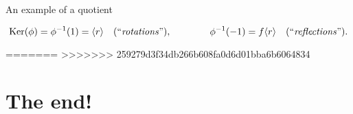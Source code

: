 \documentclass[8pt, handout]{beamer}
\begin{document}
\begin{frame}{An example of a quotient}
  \vspace{-4mm}
  
  \[
  \operatorname{Ker}(\phi)=\phi^{-1}(1)=\langle r\rangle\quad (\text{``\emph{rotations}''}),\qquad\qquad
  \phi^{-1}(-1)=f\langle r\rangle\quad (\text{``\emph{reflections}''}).
  \]
  
\end{frame}
=======
>>>>>>> 259279d3f34db266b608fa0d6d01bba6b6064834

\section{The end!}
\end{document}
